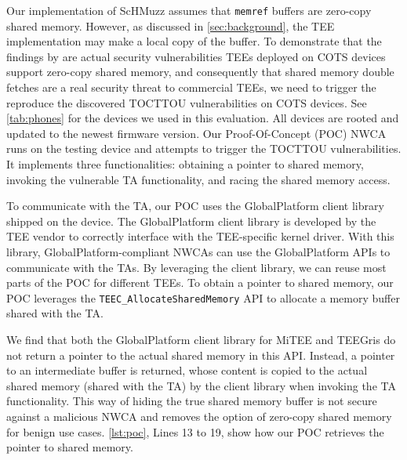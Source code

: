 \documentclass[conference]{IEEEtran} %
\newcommand{\sysname}{ScHMuzz\xspace}
\newcommand{\mitee}{MiTEE\xspace}
\newcommand{\teegris}{TEEGris\xspace}
\providecommand{\DIFaddtex}[1]{{\protect\color{blue} \sf #1}} %
\providecommand{\DIFdeltex}[1]{{\protect\color{red} \scriptsize #1}} %
\providecommand{\DIFaddbegin}{} %
\providecommand{\DIFaddend}{} %
\providecommand{\DIFdelbegin}{} %
\providecommand{\DIFdelend}{} %
\providecommand{\DIFadd}[1]{\texorpdfstring{\DIFaddtex{#1}}{#1}} %
\providecommand{\DIFdel}[1]{\texorpdfstring{\DIFdeltex{#1}}{}} %
\begin{document}
Our implementation of \sysname assumes that \texttt{memref} buffers are zero-copy shared memory. 
However, as discussed in \autoref{sec:background}, the TEE implementation may 
make a local copy of the buffer. 
To demonstrate that \DIFdelbegin \DIFdel{the findings by }%
\DIFdel{are actual security vulnerabilities}\DIFdelend \DIFaddbegin \DIFadd{TEEs deployed on COTS devices support zero-copy shared memory, 
and consequently that shared memory 
double fetches are a real security threat to commercial TEEs}\DIFaddend , we need to \DIFdelbegin \DIFdel{trigger the }\DIFdelend \DIFaddbegin \DIFadd{reproduce the discovered }\DIFaddend TOCTTOU  
vulnerabilities on COTS devices. See \autoref{tab:phones} for the devices 
we used in this evaluation. All devices are rooted and updated to the newest 
firmware version.  
Our Proof-Of-Concept (POC) NWCA runs on the testing device and attempts to trigger the TOCTTOU  
vulnerabilities. It implements three functionalities: 
obtaining a pointer to shared memory, invoking the vulnerable TA functionality, 
and racing the shared memory access. 

To communicate with the TA, our POC uses the GlobalPlatform client library shipped on the device. 
The GlobalPlatform client library is developed by the TEE vendor to correctly interface with 
the TEE-specific kernel driver. With this library, GlobalPlatform-compliant 
NWCAs can use the GlobalPlatform APIs to communicate with the TAs. By leveraging the client library, we can reuse most
parts of the POC for different TEEs. To obtain a pointer to shared memory, our POC 
leverages the \texttt{TEEC\_AllocateSharedMemory} API to allocate a memory buffer 
shared with the TA. 

We find that both the GlobalPlatform client library for \mitee 
and \teegris do not return a pointer to the actual shared memory in this API. 
Instead, a pointer to an intermediate buffer is returned, whose content is copied 
to the actual shared memory (shared with the TA) by the client library when invoking the TA 
functionality. This way of hiding the true shared memory buffer is not secure against a malicious 
NWCA and removes the option of zero-copy shared memory for benign use cases. 
\autoref{lst:poc}, Lines 13 to 19, show how our POC retrieves the pointer to shared memory.
\end{document}
